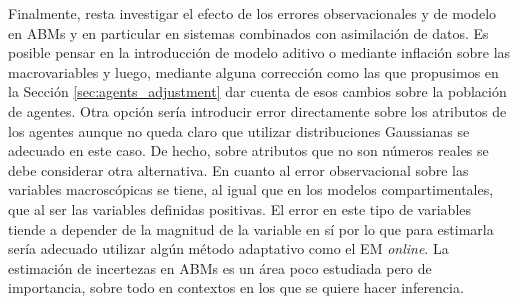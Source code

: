 Finalmente, resta investigar el efecto de los errores observacionales y de modelo en ABMs y en particular en sistemas combinados con asimilación de datos. Es posible pensar en la introducción de modelo aditivo o mediante inflación sobre las macrovariables y luego, mediante alguna corrección como las que propusimos en la Sección \ref{sec:agents_adjustment} dar cuenta de esos cambios sobre la población de agentes. Otra opción sería introducir error directamente sobre los atributos de los agentes aunque no queda claro que utilizar distribuciones Gaussianas se adecuado en este caso. De hecho, sobre  atributos que no son números reales se debe considerar otra alternativa. En cuanto al error observacional sobre las variables macroscópicas se tiene, al igual que en los modelos compartimentales, que al ser las variables definidas positivas. El error en este tipo de variables tiende a depender de la magnitud de la variable en sí por lo que para estimarla sería adecuado utilizar algún método adaptativo como el EM \textit{online}. La estimación de incertezas en ABMs es un área poco estudiada pero de importancia, sobre todo en contextos en los que se quiere hacer inferencia. 
